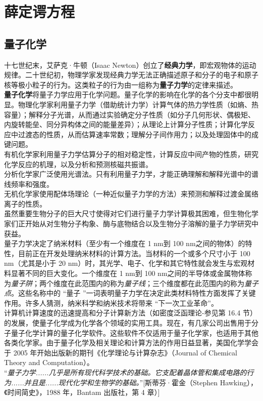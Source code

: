 	\chapter{薛定谔方程}
	\section{量子化学}
	十七世纪末，艾萨克·牛顿（Isaac Newton）创立了\textbf{经典力学}，即宏观物体的运动规律。二十世纪初，物理学家发现经典力学无法正确描述原子和分子的电子和原子核等极小粒子的行为。这类粒子的行为由一组称为\textbf{量子力学}的定律来描述。\\
	\indent \textbf{量子化学}将量子力学应用于化学问题。量子化学的影响在化学的各个分支中都很明显。物理化学家利用量子力学（借助统计力学）计算气体的热力学性质（如熵、热容量）；解释分子光谱，从而通过实验确定分子性质（如分子几何形状、偶极矩、内旋转能垒、同分异构体之间的能量差异）；从理论上计算分子性质；计算化学反应中过渡态的性质，从而估算速率常数；理解分子间作用力；以及处理固体中的成键问题。\\
	\indent 有机化学家利用量子力学估算分子的相对稳定性，计算反应中间产物的性质，研究化学反应的机理，以及分析和预测核磁共振谱。\\
	\indent 分析化学家广泛使用光谱法。只有利用量子力学，才能正确理解和解释光谱中的谱线频率和强度。\\
	\indent 无机化学家使用配体场理论（一种近似量子力学的方法）来预测和解释过渡金属络离子的性质。\\
	\indent 虽然重要生物分子的巨大尺寸使得对它们进行量子力学计算极其困难，但生物化学家们正开始从对生物分子构象、酶与底物结合以及生物分子溶解的量子力学研究中获益。\\
	\indent 量子力学决定了纳米材料（至少有一个维度在 1 nm到 100 nm之间的物体）的特性，目前正在开发处理纳米材料的计算方法。当材料的一个或多个尺寸小于 100 nm（尤其是小于 20 nm）时，其光学、电子、化学和其它特性就会发生与宏观材料显著不同的巨大变化。一个维度在 1 nm到 100 nm之间的半导体或金属物体称为\textit{量子阱}；两个维度在此范围内的称为\textit{量子线}；三个维度都在此范围内的称为\textit{量子点}。这些名称中的 “量子 ”一词表明量子力学在决定此类材料特性方面发挥了关键作用。许多人猜测，纳米科学和纳米技术将带来 “下一次工业革命”。\\
	\indent 计算机计算速度的迅速提高和分子计算新方法（如密度泛函理论-参见第 16.4 节）的发展，使量子化学成为化学各个领域的实用工具。现在，有几家公司出售用于分子量子化学计算的量子化学软件。这些软件不仅适用于量子化学家，也适用于其他各类化学家。由于量子化学及相关理论和计算方法的作用日益显著，美国化学学会于 2005 年开始出版新的期刊《化学理论与计算杂志》（Journal of Chemical Theory and Computation）。\\
	\indent “\textit{量子力学......几乎是所有现代科学技术的基础。它支配着晶体管和集成电路的行为......并且是......现代化学和生物学的基础。}”[斯蒂芬·霍金（Stephen Hawking），《时间简史》，1988 年，Bantam 出版社，第 4 章）]
	
